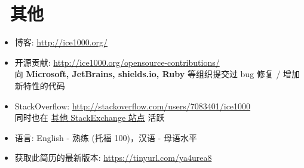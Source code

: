 \documentclass{resume}
\begin{document}
\section{\faInfo\ 其他}
\begin{itemize}[parsep=0.5ex]
  \item 博客: \url{http://ice1000.org/}
  \item 开源贡献: \url{http://ice1000.org/opensource-contributions/} \\
    向 \textbf{Microsoft, JetBrains, shields.io, Ruby} 等组织提交过 bug 修复 / 增加新特性的代码
  \item StackOverflow: \url{http://stackoverflow.com/users/7083401/ice1000} \\
    同时也在 \href{https://stackexchange.com/users/9532102/ice1000} {其他 StackExchange 站点} 活跃
  \item 语言: English - 熟练 (托福 100)，汉语 - 母语水平
  \item 获取此简历的最新版本: \url{https://tinyurl.com/ya4urea8}
\end{itemize}

%
%
\end{document}
